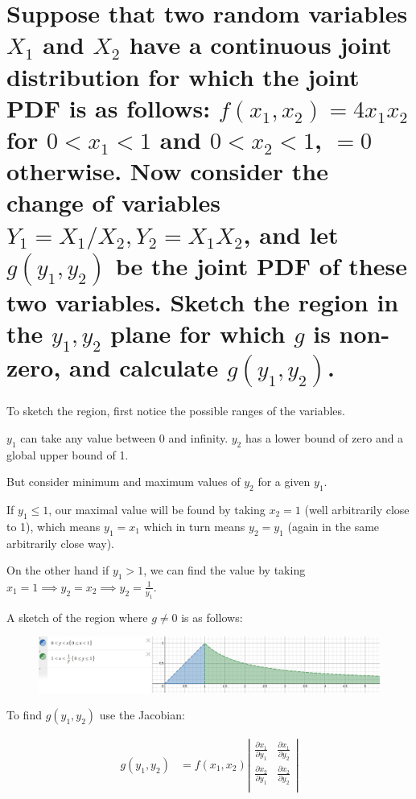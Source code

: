 \section{Suppose that two random variables
\texorpdfstring{$X_1$}{X1} and \texorpdfstring{$X_2$}{X2} have
a continuous joint distribution for which the joint PDF is as follows: 
\texorpdfstring{$f(x_1, x_2) = 4x_1x_2$ for $0<x_1<1$ and $0<x_2<1$,
$=0$ otherwise}{f(x1, x2) = 4x1x2 for 0<x1<1 and 0<x2<1, =0 otherwise}.
Now consider the change of variables 
\texorpdfstring{$Y_1 = X_1 / X_2, Y_2 = X_1 X_2$}{Y1 = X1 / X2, Y2 = X1 X2},
and let \texorpdfstring{$g(y_1, y_2)$}{g(y1, y2)} be the joint PDF of these two
variables. Sketch the region in the \texorpdfstring{$y_1, y_2$}{y1, y2} plane
for which \texorpdfstring{$g$}{g} is non-zero, and calculate
\texorpdfstring{$g(y_1, y_2)$}{g(y1, y2)}.}

To sketch the region, first notice the possible ranges of the variables.

$y_1$ can take any value between 0 and infinity. $y_2$ has a lower bound of zero and a global upper bound of 1.

But consider minimum and maximum values of $y_2$ for a given $y_1$.

If $y_1 \leq 1$, our maximal value will be found by taking $x_2=1$ (well arbitrarily close to 1), which means $y_1 = x_1$ which in turn means $y_2 = y_1$ (again in the same arbitrarily close way). 

On the other hand if $y_1 > 1$, we can find the value by taking $x_1=1 \implies y_2 = x_2 \implies y_2 = \frac{1}{y_1}$.

A sketch of the region where $g \neq 0$ is as follows:
\begin{figure}[h]
    \includegraphics[width=\textwidth]{q4_region.png}
\end{figure}

To find $g(y_1, y_2)$ use the Jacobian:

\begin{align*}
    g(y_1, y_2) &= f(x_1, x_2) \left|\begin{matrix}
        \frac{\partial x_1}{\partial y_1} & \frac{\partial x_1}{\partial y_2} \\
        \frac{\partial x_2}{\partial y_1} & \frac{\partial x_2}{\partial y_2} \\
    \end{matrix}\right| \\
\end{align*}

